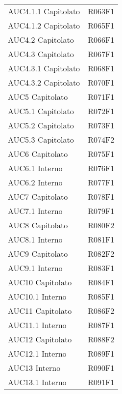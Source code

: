 \documentclass[../analisi-dei-requisiti.tex]{subfiles}
\begin{document}
\begin{longtable}[H]{ p{4cm} | p{4cm} }
  AUC4.1.1 Capitolato           & R063F1                               \\
  AUC4.1.2 Capitolato           & R065F1                               \\
  AUC4.2 Capitolato             & R066F1                               \\
  AUC4.3 Capitolato             & R067F1                               \\
  AUC4.3.1 Capitolato           & R068F1                               \\
  AUC4.3.2 Capitolato           & R070F1                               \\
  AUC5 Capitolato               & R071F1                               \\
  AUC5.1 Capitolato             & R072F1                               \\
  AUC5.2 Capitolato             & R073F1                               \\
  AUC5.3 Capitolato             & R074F2                               \\
  AUC6 Capitolato               & R075F1                               \\
  AUC6.1 Interno                & R076F1                               \\
  AUC6.2 Interno                & R077F1                               \\
  AUC7 Capitolato               & R078F1                               \\
  AUC7.1 Interno                & R079F1                               \\
  AUC8 Capitolato               & R080F2                               \\
  AUC8.1 Interno                & R081F1                               \\
  AUC9 Capitolato               & R082F2                               \\
  AUC9.1 Interno                & R083F1                               \\
  AUC10 Capitolato              & R084F1                               \\
  AUC10.1 Interno               & R085F1                               \\
  AUC11 Capitolato              & R086F2                               \\
  AUC11.1 Interno               & R087F1                               \\
  AUC12 Capitolato              & R088F2                               \\
  AUC12.1 Interno               & R089F1                               \\
  AUC13 Interno                 & R090F1                               \\
  AUC13.1 Interno               & R091F1                               \\
\end{longtable}
\end{document}
